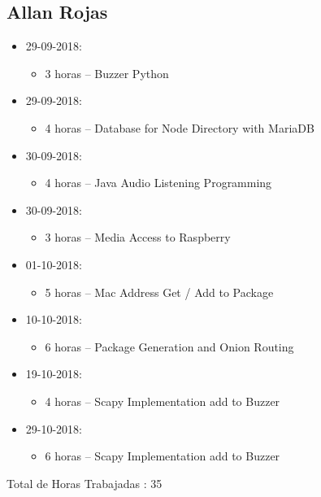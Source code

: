 \documentclass{article}
\begin{document}
\subsection{Allan Rojas}
\begin{itemize}
  \item 29-09-2018:
  \begin{itemize}
    \item 3 horas – Buzzer Python
  \end{itemize}
  \item 29-09-2018:
  \begin{itemize}
    \item 4 horas – Database for Node Directory with MariaDB
  \end{itemize}
  \item 30-09-2018:
  \begin{itemize}
    \item 4 horas – Java Audio Listening Programming
  \end{itemize}
  \item 30-09-2018:
  \begin{itemize}
    \item 3 horas – Media Access to Raspberry
  \end{itemize}
  \item 01-10-2018:
  \begin{itemize}
    \item 5 horas – Mac Address Get / Add to Package
  \end{itemize}
  \item 10-10-2018:
  \begin{itemize}
    \item 6 horas – Package Generation and Onion Routing
  \end{itemize}
  \item 19-10-2018:
  \begin{itemize}
    \item 4 horas – Scapy Implementation add to Buzzer
  \end{itemize}
  \item 29-10-2018:
  \begin{itemize}
    \item 6 horas – Scapy Implementation add to Buzzer
  \end{itemize}
\end{itemize}
Total de Horas Trabajadas : 35
\end{document}
